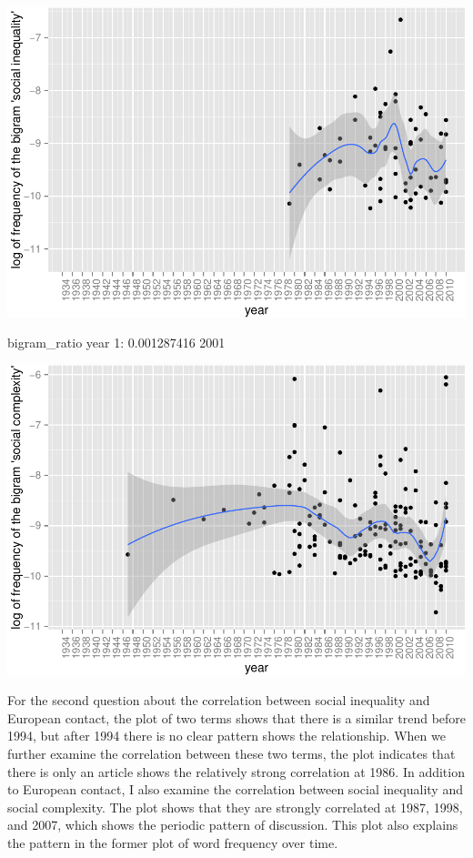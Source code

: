 \documentclass[10pt]{article}
\newenvironment{CodeChunk}{}{}
\begin{document}
\begin{CodeChunk}

\includegraphics{509Assignment_files/figure-latex/bigrams1-1} \begin{CodeOutput}
   bigram_ratio year
1:  0.001287416 2001
\end{CodeOutput}

\includegraphics{509Assignment_files/figure-latex/bigrams1-2} \end{CodeChunk}

For the second question about the correlation between social inequality
and European contact, the plot of two terms shows that there is a
similar trend before 1994, but after 1994 there is no clear pattern
shows the relationship. When we further examine the correlation between
these two terms, the plot indicates that there is only an article shows
the relatively strong correlation at 1986. In addition to European
contact, I also examine the correlation between social inequality and
social complexity. The plot shows that they are strongly correlated at
1987, 1998, and 2007, which shows the periodic pattern of discussion.
This plot also explains the pattern in the former plot of word frequency
over time.
\end{document}
